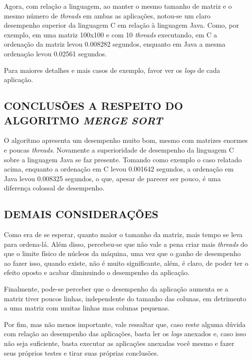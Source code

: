 		Agora, com relação a linguagem, ao manter o mesmo tamanho de matriz e o mesmo número de \textit{threads} em ambas as aplicações, notou-se um claro desempenho superior da linguagem C em relação à linguagem Java. Como, por exemplo, em uma matriz 100x100 e com 10 \textit{threads} executando, em C a ordenação da matriz levou 0.008282 segundos, enquanto em Java a mesma ordenação levou 0.02561 segundos. 
		
		Para maiores detalhes e mais casos de exemplo, favor ver os \textit{logs} de cada aplicação.
		
	\subsection{\normalsize CONCLUSÕES A RESPEITO DO ALGORITMO \textit{MERGE SORT}}
		O algoritmo apresenta um desempenho muito bom, mesmo com matrizes enormes e poucas \textit{threads}. Novamente a superioridade de desempenho da linguagem C sobre a linguagem Java se faz presente. Tomando como exemplo o caso relatado acima, enquanto a ordenação em C levou 0.001642 segundos, a ordenação em Java levou 0.008325 segundos, o que, apesar de parecer ser pouco, é uma diferença colossal de desempenho.
		
	\subsection{\normalsize DEMAIS CONSIDERAÇÕES}
		Como era de se esperar, quanto maior o tamanho da matriz, mais tempo se leva para ordena-lá. Além disso, percebeu-se que não vale a pena criar mais \textit{threads} do que o limite físico de núcleos da máquina, uma vez que o ganho de desempenho ao fazer isso, quando existe, não é muito significante, além, é claro, de poder ter o efeito oposto e acabar diminuindo o desempenho da aplicação.
		
		Finalmente, pode-se perceber que o desempenho da aplicação aumenta se a matriz tiver poucos linhas, independente do tamanho das colunas, em detrimento a uma matriz com muitas linhas mas colunas pequenas.
		
		Por fim, mas não menos importante, vale ressaltar que, caso reste alguma dúvida com relação ao desempenho das aplicações, basta ler os \textit{logs} anexados e, caso isso não seja suficiente, basta executar as aplicações anexadas você mesmo e fazer seus próprios testes e tirar suas próprias conclusões.